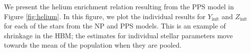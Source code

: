 \documentclass[a4paper,fleqn,usenatbib]{mnras}
\newcommand{\mlt}{\ensuremath{{\alpha_\mathrm{MLT}}}}
\begin{document}
We present the helium enrichment relation resulting from the PPS model in Figure \ref{fig:helium}. In this figure, we plot the individual results for $Y_\mathrm{init}$ and $Z_\mathrm{init}$ for each of the stars from the NP and PPS models. This is an example of shrinkage in the HBM; the estimates for individual stellar parameters move towards the mean of the population when they are pooled.



\end{document}
